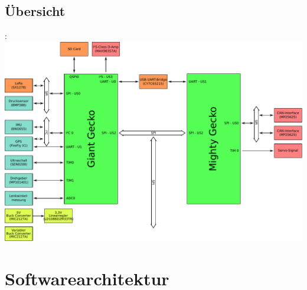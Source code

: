 \documentclass{beamer}
\begin{document}
\subsection{Übersicht}
\begin{frame}{\insertsection: \insertsubsection}
	\centering
	\includegraphics[width=0.9\linewidth]{architecture_detailed}
\end{frame}

\section{Softwarearchitektur}
\end{document}
